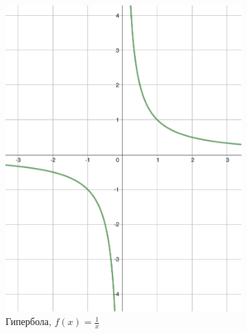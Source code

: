 \begin{figure}[h]
    \centering
    \begin{subfigure}{0.35\textwidth}
        \includegraphics[width=\textwidth]{tex/chapter_1/assets/y=1_div_by_x.pdf}
        \caption*{Гипербола, $f(x) = \frac{1}{x}$}
    \end{subfigure}
    \hfill
    \begin{subfigure}{0.35\textwidth}

\end{subfigure}
\end{figure}
